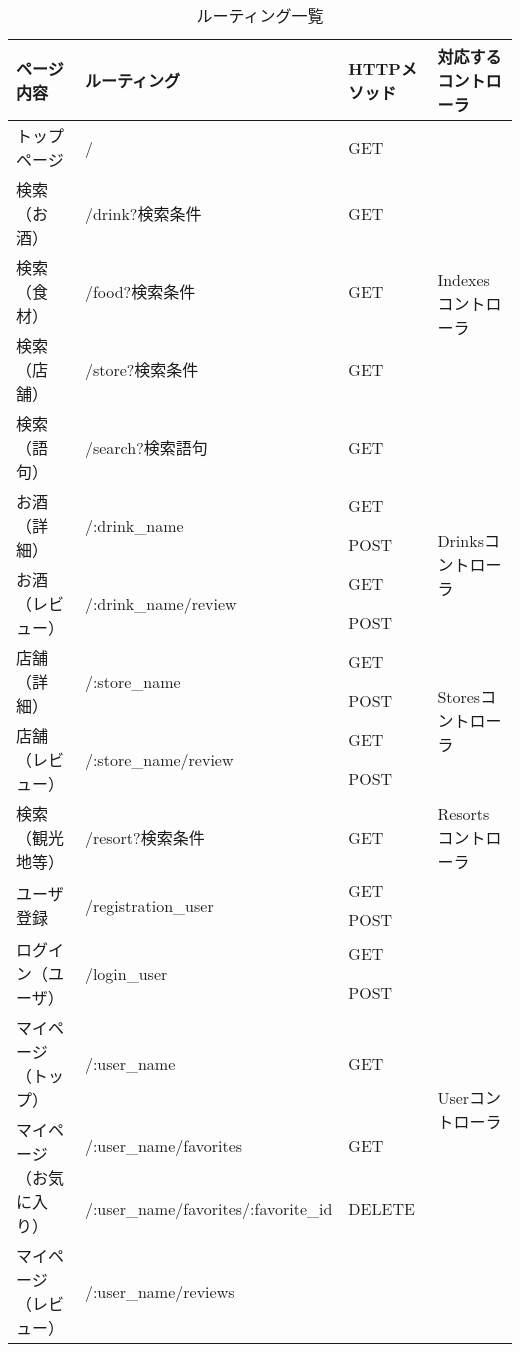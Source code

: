 \documentclass[a4j,titlepage]{jarticle}
\begin{document}
\begin{table}[!htbp]
\caption{ルーティング一覧}
\label{routing}
\small
\begin{center}
\begin{tabular}{|l|l|l|p{4cm}|}\hline
ページ内容 & ルーティング & HTTPメソッド & 対応するコントローラ\\\hline\hline
トップページ & / & GET & \multirow{5}{*}{Indexesコントローラ} \\\cline{1-3}
検索（お酒） & /drink?検索条件 & GET & \\\cline{1-3}
検索（食材） & /food?検索条件 & GET & \\\cline{1-3}
検索（店舗） & /store?検索条件 & GET &  \\\cline{1-3}
検索（語句） & /search?検索語句 & GET & \\\hline
\multirow{2}{*}{お酒（詳細）} & \multirow{2}{*}{/:drink\_name}
& GET & \multirow{4}{*}{Drinksコントローラ} \\\cline{3-3}
 & & POST &  \\\cline{1-3}
\multirow{2}{*}{お酒（レビュー）} & \multirow{2}{*}{/:drink\_name/review}
& GET & \\\cline{3-3}
 & & POST & \\\hline
\multirow{2}{*}{店舗（詳細）} & \multirow{2}{*}{/:store\_name}
& GET & \multirow{4}{*}{Storesコントローラ} \\\cline{3-3}
 & & POST &  \\\cline{1-3}
\multirow{2}{*}{店舗（レビュー）}& \multirow{2}{*}{/:store\_name/review}
& GET &  \\\cline{3-3}
 & & POST &\\\hline
検索（観光地等） & /resort?検索条件 & GET & Resortsコントローラ \\\hline
\multirow{2}{*}{ユーザ登録} & \multirow{2}{*}{/registration\_user}
& GET & \multirow{12}{*}{Userコントローラ} \\\cline{3-3}
 & & POST & \\\cline{1-3}
 \multirow{2}{*}{ログイン（ユーザ）} & \multirow{2}{*}{/login\_user}
 & GET & \\\cline{3-3}
 & & POST & \\\cline{1-3}
マイページ（トップ） & /:user\_name
& GET & \\\cline{1-3}
\multirow{2}{*}{マイページ（お気に入り）} & /:user\_name/favorites
& GET & \\\cline{2-3}
 & /:user\_name/favorites/:favorite\_id & DELETE & \\\cline{1-3}
\multirow{2}{*}{マイページ（レビュー）} & /:user\_name/reviews

\end{tabular}
\end{center}
\end{table}
\end{document}

